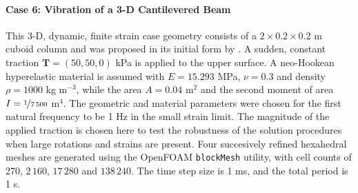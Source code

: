 \documentclass[sn-mathphys,Numbered]{sn-jnl}%
\newcommand{\bb}{\boldsymbol}
\begin{document}
\paragraph{Case 6: Vibration of a 3-D Cantilevered Beam}
This 3-D, dynamic, finite strain case geometry consists of a $2 \times 0.2 \times 0.2$ m cuboid column and was proposed in its initial form by \citet{Tukovic2007}.
A sudden, constant traction $\bb{T} = \left(50, 50, 0 \right)$ kPa is applied to the upper surface.
A neo-Hookean hyperelastic material is assumed with $E = 15.293$ MPa, $\nu = 0.3$ and density $\rho = 1000$ kg m$^{-3}$, while the area $A = 0.04$ m$^2$ and the second moment of area $I = \nicefrac{1}{7\,500}$ m$^4$. %
The geometric and material parameters were chosen for the first natural frequency to be 1 Hz in the small strain limit.
The magnitude of the applied traction is chosen here to test the robustness of the solution procedures when large rotations and strains are present.
Four succesively refined hexahedral meshes are generated using the OpenFOAM \texttt{blockMesh} utility, with cell counts of 270, $2\,160$, $17\,280$ and $138\,240$.
The time step size is 1 ms, and the total period is 1 s.
\end{document}
